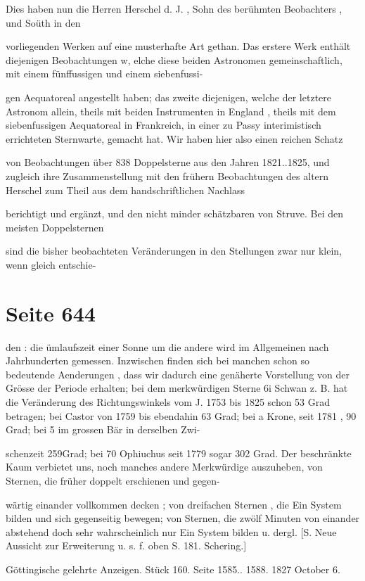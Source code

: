 \documentclass[10pt,a4paper]{article}
\begin{document}
Dies haben nun die Herren Herschel d. J. , Sohn des berühmten Beobachters , und Soüth in den

vorliegenden Werken auf eine musterhafte Art gethan. Das erstere Werk enthält diejenigen Beobachtungen w, elche diese beiden Astronomen gemeinschaftlich, mit einem fünffussigen und einem siebenfussi-

gen Aequatoreal angestellt haben; das zweite diejenigen, welche der letztere Astronom allein, theils mit beiden Instrumenten in England , theils mit dem siebenfussigen Aequatoreal in Frankreich, in einer zu Passy interimistisch errichteten Sternwarte, gemacht hat. Wir haben hier also einen reichen Schatz

von Beobachtungen über 838 Doppelsterne aus den Jahren 1821..1825, und zugleich ihre Zusammenstellung mit den frühern Beobachtungen des altern Herschel zum Theil aus dem handschriftlichen Nachlass

berichtigt und ergänzt, und den nicht minder schätzbaren von Struve. Bei den meisten Doppelsternen

sind die bisher beobachteten Veränderungen in den Stellungen zwar nur klein, wenn gleich entschie-


\newpage
\section*{Seite 644}
den : die ümlaufszeit einer Sonne um die andere wird im Allgemeinen nach Jahrhunderten gemessen. Inzwischen finden sich bei manchen schon so bedeutende Aenderungen , dass wir dadurch eine genäherte Vorstellung von der Grösse der Periode erhalten; bei dem merkwürdigen Sterne 6i Schwan z. B. hat die Veränderung des Richtungswinkels vom J. 1753 bis 1825 schon 53 Grad betragen; bei Castor von 1759 bis ebendahin 63 Grad; bei a Krone, seit 1781 , 90 Grad; bei 5 im grossen Bär in derselben Zwi-

schenzeit 259Grad; bei 70 Ophiuchus seit 1779 sogar 302 Grad. Der beschränkte Kaum verbietet uns, noch manches andere Merkwürdige auszuheben, von Sternen, die früher doppelt erschienen und gegen-

wärtig einander vollkommen decken ; von dreifachen Sternen , die Ein System bilden und sich gegenseitig bewegen; von Sternen, die zwölf Minuten von einander abstehend doch sehr wahrscheinlich nur Ein System bilden u. dergl. [S. Neue Aussicht zur Erweiterung u. s. f. oben S. 181. Schering.]

Göttingische gelehrte Anzeigen. Stück 160. Seite 1585.. 1588. 1827 October 6.
\end{document}
